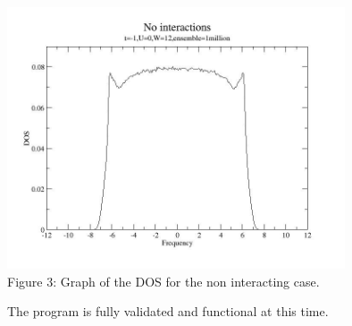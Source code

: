 \documentclass{article}
\begin{document}
\begin{center}
\includegraphics [width=10cm]{dos_t-1u0w12.jpg} \\
Figure 3: Graph of the DOS for the non interacting case.
\end{center}
\smallskip
The program is fully validated and functional at this time.
\end{document}
